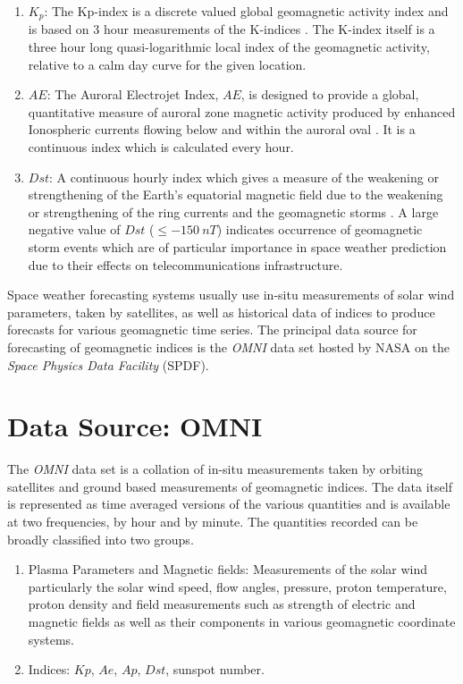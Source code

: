 \documentclass{article}
\begin{document}
\begin{enumerate}
    \item $K_p$: The Kp-index is a discrete valued global geomagnetic activity index and is based on 3 hour measurements of the K-indices \citep{Bartels}. The K-index itself is a three hour long quasi-logarithmic local index of the geomagnetic activity, relative to a calm day curve for the given location.
    
    \item $AE$: The Auroral Electrojet Index, $AE$, is designed to provide a global, quantitative measure of auroral zone magnetic activity produced by enhanced Ionospheric currents flowing below and within the auroral oval \citep{AEIndex}. It is a continuous index which is calculated every hour.
    
    \item $Dst$: A continuous hourly index which gives a measure of the weakening or strengthening of the Earth's equatorial magnetic field due to the weakening or strengthening of the ring currents and the geomagnetic storms \citep{DesslerAndParker}. A large negative value of $Dst$ ($ \leq -150 \ nT$) indicates occurrence of geomagnetic storm events which are of particular importance in space weather prediction due to their effects on telecommunications infrastructure. 
\end{enumerate}

Space weather forecasting systems usually use in-situ measurements of solar wind parameters, taken by satellites, as well as historical data of indices to produce forecasts for various geomagnetic time series. The principal data source for forecasting of geomagnetic indices is the \emph{OMNI} data set hosted by NASA on the \emph{Space Physics Data Facility} (SPDF).

\section{Data Source: OMNI}
The \emph{OMNI} data set is a collation of in-situ measurements taken by orbiting satellites and ground based measurements of geomagnetic indices. The data itself is represented as time averaged versions of the various quantities and is available at two frequencies, by hour and by minute. The quantities recorded can be broadly classified into two groups.

\begin{enumerate}

  \item Plasma Parameters and Magnetic fields: Measurements of the solar wind particularly the solar wind speed, flow angles, pressure, proton temperature, proton density and field measurements such as strength of electric and magnetic fields as well as their components in various geomagnetic coordinate systems.
  
  \item Indices: $Kp$, $Ae$, $Ap$, $Dst$, sunspot number.
  
\end{enumerate}
\end{document}
